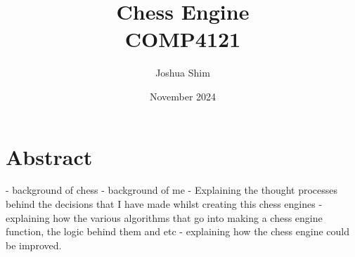 \documentclass[twoside]{report}
\title{Chess Engine\\
{\Large COMP4121}}
\author{Joshua Shim}
\date{November 2024}
\begin{document}
\maketitle
\chapter*{Abstract}

- background of chess
- background of me
- Explaining the thought processes behind the decisions that I have made whilst creating this chess engines
- explaining how the various algorithms that go into making a chess engine function, the logic behind them and etc
- explaining how the chess engine could be improved.

\tableofcontents






\end{document}
